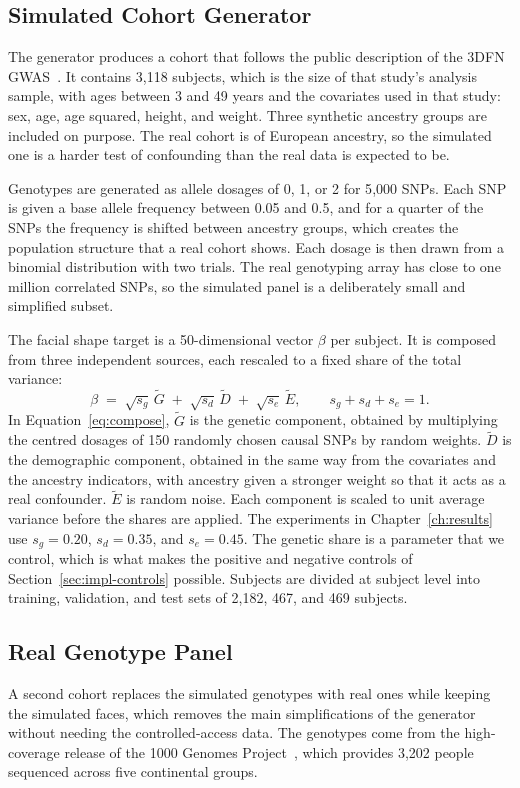 \subsection{Simulated Cohort Generator}
\label{sec:impl-cohort}
The generator produces a cohort that follows the public description of the 3DFN GWAS~\cite{ref:shaffer,ref:weinberg}. It contains 3{,}118 subjects, which is the size of that study's analysis sample, with ages between 3 and 49 years and the covariates used in that study: sex, age, age squared, height, and weight. Three synthetic ancestry groups are included on purpose. The real cohort is of European ancestry, so the simulated one is a harder test of confounding than the real data is expected to be.

Genotypes are generated as allele dosages of 0, 1, or 2 for 5{,}000 SNPs. Each SNP is given a base allele frequency between 0.05 and 0.5, and for a quarter of the SNPs the frequency is shifted between ancestry groups, which creates the population structure that a real cohort shows. Each dosage is then drawn from a binomial distribution with two trials. The real genotyping array has close to one million correlated SNPs, so the simulated panel is a deliberately small and simplified subset.

The facial shape target is a 50-dimensional vector $\beta$ per subject. It is composed from three independent sources, each rescaled to a fixed share of the total variance:
\begin{equation}\label{eq:compose}
\beta \;=\; \sqrt{s_g}\,\tilde{G} \;+\; \sqrt{s_d}\,\tilde{D} \;+\; \sqrt{s_e}\,\tilde{E}, \qquad s_g + s_d + s_e = 1 .
\end{equation}
In Equation~\ref{eq:compose}, $\tilde{G}$ is the genetic component, obtained by multiplying the centred dosages of 150 randomly chosen causal SNPs by random weights. $\tilde{D}$ is the demographic component, obtained in the same way from the covariates and the ancestry indicators, with ancestry given a stronger weight so that it acts as a real confounder. $\tilde{E}$ is random noise. Each component is scaled to unit average variance before the shares are applied. The experiments in Chapter~\ref{ch:results} use $s_g = 0.20$, $s_d = 0.35$, and $s_e = 0.45$. The genetic share is a parameter that we control, which is what makes the positive and negative controls of Section~\ref{sec:impl-controls} possible. Subjects are divided at subject level into training, validation, and test sets of 2{,}182, 467, and 469 subjects.

\subsection{Real Genotype Panel}
\label{sec:impl-1kg}
A second cohort replaces the simulated genotypes with real ones while keeping the simulated faces, which removes the main simplifications of the generator without needing the controlled-access data. The genotypes come from the high-coverage release of the 1000 Genomes Project~\cite{ref:kgenomes}, which provides 3{,}202 people sequenced across five continental groups.


